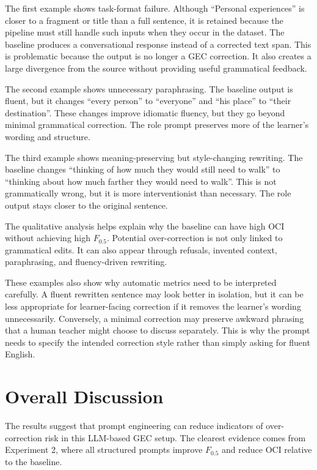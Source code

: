 The first example shows task-format failure. Although ``Personal experiences'' is closer to a fragment or title than a full sentence, it is retained because the pipeline must still handle such inputs when they occur in the dataset. The baseline produces a conversational response instead of a corrected text span. This is problematic because the output is no longer a GEC correction. It also creates a large divergence from the source without providing useful grammatical feedback.

The second example shows unnecessary paraphrasing. The baseline output is fluent, but it changes ``every person'' to ``everyone'' and ``his place'' to ``their destination''. These changes improve idiomatic fluency, but they go beyond minimal grammatical correction. The role prompt preserves more of the learner's wording and structure.

The third example shows meaning-preserving but style-changing rewriting. The baseline changes ``thinking of how much they would still need to walk'' to ``thinking about how much farther they would need to walk''. This is not grammatically wrong, but it is more interventionist than necessary. The role output stays closer to the original sentence.

The qualitative analysis helps explain why the baseline can have high OCI without achieving high $F_{0.5}$. Potential over-correction is not only linked to grammatical edits. It can also appear through refusals, invented context, paraphrasing, and fluency-driven rewriting.

These examples also show why automatic metrics need to be interpreted carefully. A fluent rewritten sentence may look better in isolation, but it can be less appropriate for learner-facing correction if it removes the learner's wording unnecessarily. Conversely, a minimal correction may preserve awkward phrasing that a human teacher might choose to discuss separately. This is why the prompt needs to specify the intended correction style rather than simply asking for fluent English.

\section{Overall Discussion}

The results suggest that prompt engineering can reduce indicators of over-correction risk in this LLM-based GEC setup. The clearest evidence comes from Experiment 2, where all structured prompts improve $F_{0.5}$ and reduce OCI relative to the baseline.

